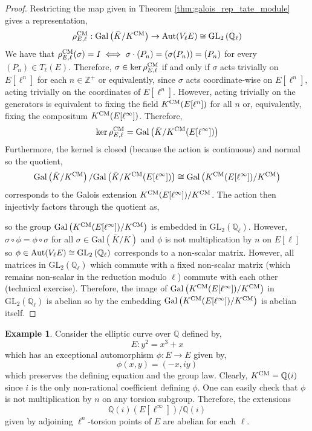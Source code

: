 \documentclass{article}
\newcommand{\Gal}[1]{\mathrm{Gal}\left( #1 \right)}
\newcommand{\Aut}[1]{\mathrm{Aut} \small(#1 \small)}
\newcommand{\GL}[2]{\mathrm{GL}_{#1}\left(#2\right)}
\newcommand{\Z}{\mathbb{Z}}
\newcommand{\Q}{\mathbb{Q}}
\theoremstyle{definition}
\newtheorem{example}[theorem]{Example}
\begin{document}
\begin{proof}
Restricting the map given in Theorem \ref{thm:galois_rep_tate_module} gives a representation,
\[ \rho^{\CM}_{E, \ell} : \Gal{\bar{K} / K^{\CM}} \to \Aut{V_{\ell}E} \cong \GL{2}{\Q_{\ell}} \]
We have that $\rho^{\mathrm{CM}}_{E, \ell}(\sigma) = I \iff \sigma \cdot (P_n) = (\sigma(P_n)) = (P_n)$ for every $(P_n) \in T_{\ell}(E)$. Therefore, $\sigma \in \ker{\rho^{\mathrm{CM}}_{E, \ell}}$ if and only if $\sigma$ acts trivially on $E[\ell^n]$ for each $n \in \Z^{+}$ or equivalently, since $\sigma$ acts coordinate-wise on $E[\ell^n]$, acting trivially on the coordinates of $E[\ell^n]$. However, acting trivially on the generators is equivalent to fixing the field $K^{\mathrm{CM}}(E[\ell^n])$ for all $n$ or, equivalently, fixing the compositum $K^{\mathrm{CM}}(E[\ell^\infty])$. Therefore,
\[ \ker{\rho^{\CM}_{E,\ell}} = \Gal{\bar{K} / K^{\CM}(E[\ell^\infty])} \]
Furthermore, the kernel is closed (because the action is continuous) and normal so the quotient,
\[ \Gal{\bar{K} / K^{\CM}} / \Gal{\bar{K} / K^{\CM}(E[\ell^\infty])} \cong \Gal{K^{\CM}(E[\ell^\infty]) / K^{\CM}} \]
corresponds to the Galois extension $K^{\mathrm{CM}}(E[\ell^\infty]) / K^{\mathrm{CM}}$. 
The action then injectivly factors through the quotient as,
\begin{center}
\end{center}
so the group $\Gal{K^{\CM}(E[\ell^\infty]) / K^{\CM}}$ is embedded in $\GL{2}{\Q_{\ell}}$. However, $\sigma \circ \phi = \phi \circ \sigma$ for all $\sigma \in \Gal{\bar{K} / K}$ and $\phi$ is not multiplication by $n$ on $E[\ell]$ so $\phi \in \Aut{V_{\ell}E} \cong \GL{2}{\Q_{\ell}}$ corresponds to a non-scalar matrix. However, all matrices in $\GL{2}{\Q_{\ell}}$ which commute with a fixed non-scalar matrix (which remains non-scalar in the reduction modulo $\ell$) commute with each other (technical exercise). Therefore, the image of $\Gal{K^{\CM}(E[\ell^\infty]) / K^{\CM}}$ in $\GL{2}{\Q_{\ell}}$ is abelian so by the embedding $\Gal{K^{\CM}(E[\ell^\infty]) / K^{\CM}}$ is abelian itself. 
\end{proof}

\begin{example}
Consider the elliptic curve over $\Q$ defined by,
\[ E : y^2 = x^3 + x \]
which has an exceptional automorphism $\phi : E \to E$ given by,
\[ \phi(x, y) = (-x, iy) \]
which preserves the defining equation and the group law. Clearly, $K^{\CM} = \Q(i)$ since $i$ is the only non-rational coefficient defining $\phi$. One can easily check that $\phi$ is not multiplication by $n$ on any torsion subgroup. Therefore, the extensions
\[ \Q(i)(E[\ell^\infty]) / \Q(i) \]
given by adjoining $\ell^n$-torsion points of $E$ are abelian for each $\ell$. 
\end{example}
\end{document}
